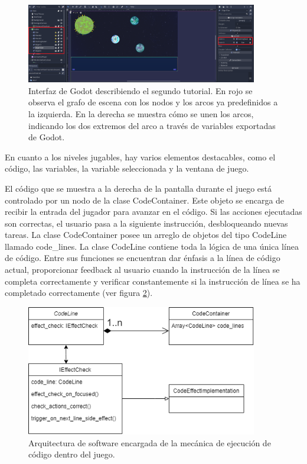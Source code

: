 \begin{figure}[h]
	\centering
	\includegraphics[width=0.9\textwidth]{imagenes/SecondTutorialGraph.png}
	\caption{Interfaz de Godot describiendo el segundo tutorial. En rojo se observa el grafo de escena con los nodos y los arcos ya predefinidos a la izquierda. En la derecha se muestra cómo se unen los arcos, indicando los dos extremos del arco a través de variables exportadas de Godot.}
	\label{SecondTutorialGraph}
\end{figure}


En cuanto a los niveles jugables, hay varios elementos destacables, como el código, las variables, la variable seleccionada y la ventana de juego.

El código que se muestra a la derecha de la pantalla durante el juego está controlado por un nodo de la clase CodeContainer. Este objeto se encarga de recibir la entrada del jugador para avanzar en el código. Si las acciones ejecutadas son correctas, el usuario pasa a la siguiente instrucción, desbloqueando nuevas tareas. La clase CodeContainer posee un arreglo de objetos del tipo CodeLine llamado code\_lines. La clase CodeLine contiene toda la lógica de una única línea de código. Entre sus funciones se encuentran dar énfasis a la línea de código actual, proporcionar feedback al usuario cuando la instrucción de la línea se completa correctamente y verificar constantemente si la instrucción de línea se ha completado correctamente (ver figura \ref{CodeLinesArchitecture}).

\begin{figure}[h]
	\centering
	\includegraphics[width=0.9\textwidth]{imagenes/CodeLinesArchitecture.png}
	\caption{Arquitectura de software encargada de la mecánica de ejecución de código dentro del juego.}
	\label{CodeLinesArchitecture}
\end{figure}

